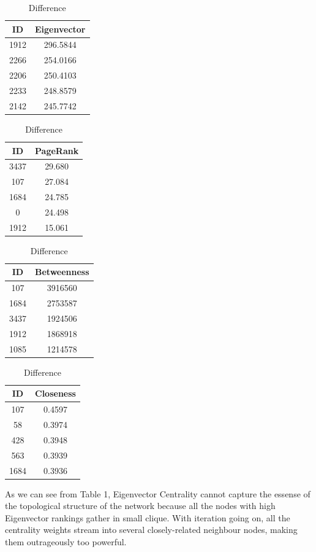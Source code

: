 \documentclass[11pt]{article}
\begin{document}
\begin{table}[H]
	\centering
	\parbox{.2\linewidth}{
		\centering
	\begin{tabular}{cc}
		\hline ID & Eigenvector\\\hline
		1912 & 296.5844\\
		2266 & 254.0166\\
		2206 & 250.4103\\
		2233 & 248.8579\\
		2142 & 245.7742
	\end{tabular}
}\quad
	\parbox{.2\linewidth}{
	\centering
	\begin{tabular}{cc}
		\hline ID & PageRank\\\hline
		3437 & 29.680\\
		107 & 27.084\\
		1684 & 24.785\\
		0 & 24.498\\
		1912 & 15.061
	\end{tabular}
}\quad
	\parbox{.2\linewidth}{
	\centering
	\begin{tabular}{cc}
		\hline ID & Betweenness\\\hline
		107 & 3916560\\
		1684 & 2753587\\
		3437 & 1924506\\
		1912 & 1868918\\
		1085 & 1214578
	\end{tabular}
}\quad
	\parbox{.2\linewidth}{
	\centering
	\begin{tabular}{cc}
		\hline ID & Closeness\\\hline
		107 & 0.4597\\
		58 & 0.3974\\
		428 & 0.3948\\
		563 & 0.3939\\
		1684 & 0.3936
	\end{tabular}
}
\caption{Difference}
\end{table}
As we can see from Table 1, Eigenvector Centrality cannot capture the essense of the topological structure of the network because all the nodes with high Eigenvector rankings gather in small clique. With iteration going on, all the centrality weights stream into several closely-related neighbour nodes, making them outrageously too powerful.
\end{document}
